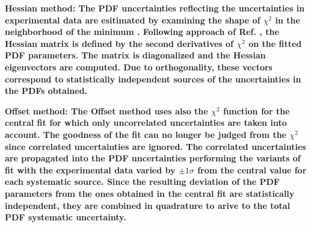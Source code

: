 \begin{description}
\item \bf{Hessian method:} \rm
The PDF uncertainties reflecting the uncertainties in experimental data are esitimated by 
examining the shape of $\chi^2$ in the neighborhood of the minimum \cite{Pumplin:2001ct}.
Following approach of Ref. \cite{Pumplin:2001ct}, the Hessian matrix is defined by the second 
derivatives of $\chi^2$ on the fitted PDF parameters. The matrix is diagonalized and the 
Hessian eigenvectors are computed. 
Due to orthogonality, these vectors correspond to statistically independent sources of the
uncertainties in the PDFs obtained.
%

\item \bf{Offset  method:} \rm
The Offset method \cite{Botje:2001fx} uses
%
also the $\chi^2$ function for the central fit for which only
uncorrelated uncertainties are taken into account. 
The goodness of the fit can no longer be judged from the $\chi^2$ since correlated uncertainties are ignored. 
The correlated uncertainties are propagated into the PDF uncertainties performing the variants 
of fit with the experimental data varied by $\pm 1 \sigma$ from the central value  
for each systematic source.
Since the resulting deviation of the PDF parameters from the ones obtained in the central 
fit are statistically independent, they are combined in quadrature to arive to the total 
PDF systematic uncertainty.
%


\end{description}
